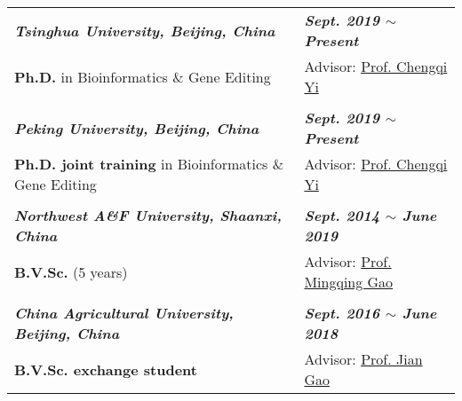 

\renewcommand{\thefootnote}{\fnsymbol{footnote}}
\setcounter{footnote}{0}
\begin{longtable}{p{} p{}}
    \textit{\textbf{Tsinghua University, Beijing, China}} & \textit{\textbf{Sept. 2019 $\sim$ Present}} \\
    \textbf{Ph.D.} in Bioinformatics \& Gene Editing & Advisor: \href{https://www.bio.pku.edu.cn/enhomes/news/teacher_dis/91.html}{Prof. Chengqi Yi} \\
    & \\
    \textit{\textbf{Peking University, Beijing, China}} & \textit{\textbf{Sept. 2019 $\sim$ Present}} \\
    \textbf{Ph.D. joint training} in Bioinformatics \& Gene Editing & Advisor: \href{https://www.bio.pku.edu.cn/enhomes/news/teacher_dis/91.html}{Prof. Chengqi Yi} \\
    & \\
    \textit{\textbf{Northwest A\&F University, Shaanxi, China}} & \textit{\textbf{Sept. 2014 $\sim$ June 2019}} \\
    \textbf{B.V.Sc.} (5 years) & Advisor: \href{https://faculty.nwu.edu.cn/gaomingqing/en/index.htm}{Prof. Mingqing Gao} \\
    & \\
    \textit{\textbf{China Agricultural University, Beijing, China}} & \textit{\textbf{Sept. 2016 $\sim$ June 2018}} \\
    \textbf{B.V.Sc. exchange student} & Advisor: \href{https://cvm.cau.edu.cn/art/2017/9/12/art_41957_71.html}{Prof. Jian Gao} \\
\end{longtable}



\renewcommand{\thefootnote}{\arabic{footnote}}
\setcounter{footnote}{1}
